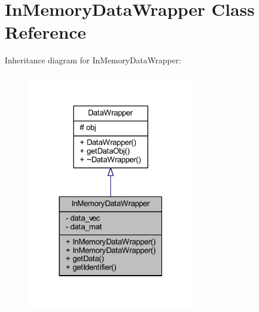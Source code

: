 \hypertarget{class_in_memory_data_wrapper}{}\section{In\+Memory\+Data\+Wrapper Class Reference}
\label{class_in_memory_data_wrapper}


Inheritance diagram for In\+Memory\+Data\+Wrapper\+:\nopagebreak
\begin{figure}[H]
\begin{center}
\leavevmode
\includegraphics[width=211pt]{class_in_memory_data_wrapper__inherit__graph}
\end{center}
\end{figure}


